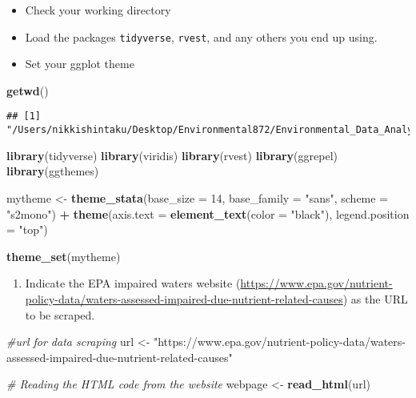 \documentclass[]{article}
\newenvironment{Shaded}{\begin{snugshade}}{\end{snugshade}}
\newcommand{\CommentTok}[1]{\textcolor[rgb]{0.56,0.35,0.01}{\textit{#1}}}
\newcommand{\DataTypeTok}[1]{\textcolor[rgb]{0.13,0.29,0.53}{#1}}
\newcommand{\DecValTok}[1]{\textcolor[rgb]{0.00,0.00,0.81}{#1}}
\newcommand{\KeywordTok}[1]{\textcolor[rgb]{0.13,0.29,0.53}{\textbf{#1}}}
\newcommand{\NormalTok}[1]{#1}
\newcommand{\OperatorTok}[1]{\textcolor[rgb]{0.81,0.36,0.00}{\textbf{#1}}}
\newcommand{\StringTok}[1]{\textcolor[rgb]{0.31,0.60,0.02}{#1}}
\providecommand{\tightlist}{%
  \setlength{\itemsep}{0pt}\setlength{\parskip}{0pt}}
\begin{document}
\begin{itemize}
\tightlist
\item
  Check your working directory
\item
  Load the packages \texttt{tidyverse}, \texttt{rvest}, and any others
  you end up using.
\item
  Set your ggplot theme
\end{itemize}

\begin{Shaded}
\begin{Highlighting}[]
\KeywordTok{getwd}\NormalTok{()}
\end{Highlighting}
\end{Shaded}

\begin{verbatim}
## [1] "/Users/nikkishintaku/Desktop/Environmental872/Environmental_Data_Analytics_2020"
\end{verbatim}

\begin{Shaded}
\begin{Highlighting}[]
\KeywordTok{library}\NormalTok{(tidyverse)}
\KeywordTok{library}\NormalTok{(viridis)}
\KeywordTok{library}\NormalTok{(rvest)}
\KeywordTok{library}\NormalTok{(ggrepel)}
\KeywordTok{library}\NormalTok{(ggthemes)}

\NormalTok{mytheme <-}\StringTok{ }\KeywordTok{theme_stata}\NormalTok{(}\DataTypeTok{base_size =} \DecValTok{14}\NormalTok{, }\DataTypeTok{base_family =} \StringTok{"sans"}\NormalTok{, }\DataTypeTok{scheme =} \StringTok{"s2mono"}\NormalTok{) }\OperatorTok{+}
\StringTok{  }\KeywordTok{theme}\NormalTok{(}\DataTypeTok{axis.text =} \KeywordTok{element_text}\NormalTok{(}\DataTypeTok{color =} \StringTok{"black"}\NormalTok{), }
        \DataTypeTok{legend.position =} \StringTok{"top"}\NormalTok{)}

\KeywordTok{theme_set}\NormalTok{(mytheme)}
\end{Highlighting}
\end{Shaded}

\begin{enumerate}
\def\labelenumi{\arabic{enumi}.}
\setcounter{enumi}{1}
\tightlist
\item
  Indicate the EPA impaired waters website
  (\url{https://www.epa.gov/nutrient-policy-data/waters-assessed-impaired-due-nutrient-related-causes})
  as the URL to be scraped.
\end{enumerate}

\begin{Shaded}
\begin{Highlighting}[]
\CommentTok{#url for data scraping}
\NormalTok{url <-}\StringTok{ "https://www.epa.gov/nutrient-policy-data/waters-assessed-impaired-due-nutrient-related-causes"}

\CommentTok{# Reading the HTML code from the website}
\NormalTok{webpage <-}\StringTok{ }\KeywordTok{read_html}\NormalTok{(url)}
\end{Highlighting}
\end{Shaded}
\end{document}
